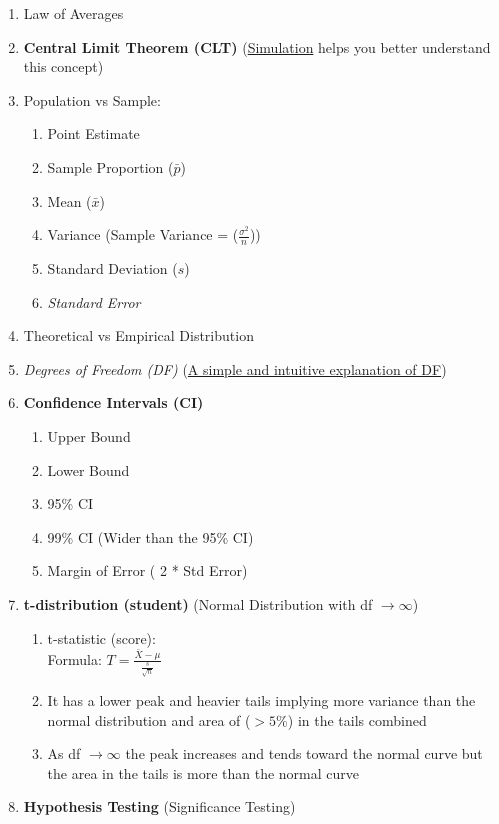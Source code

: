 \documentclass[11pt]{article}
\begin{document}
\begin{enumerate}
		\item Law of Averages
		\item \textbf{Central Limit Theorem (CLT)} (\href{http://onlinestatbook.com/2/sampling_distributions/clt_demo.html}{Simulation} helps you better understand this concept)
		\item Population vs Sample:
		\begin{enumerate}
			\item Point Estimate
			\item Sample Proportion ($\bar{p}$)
			\item Mean ($\bar{x}$)
			\item Variance (Sample Variance = ($ \frac{\sigma^2}{n} $))
			\item Standard Deviation ($s$)
			\item \textit{Standard Error}
		\end{enumerate}
		\item Theoretical vs Empirical Distribution
		\item \textit{Degrees of Freedom (DF)} (\href{https://www.youtube.com/watch?v=rATNoxKg1yA}{A simple and intuitive explanation of DF})
		\item \textbf{Confidence Intervals (CI)}
		\begin{enumerate}
			\item Upper Bound
			\item Lower Bound
			\item 95\% CI
			\item 99\% CI (Wider than the 95\% CI)
			\item Margin of Error ( 2 * Std Error)
		\end{enumerate}
		\item \textbf{t-distribution (student)} (Normal Distribution with df $ \to \infty$)
		\begin{enumerate}
			\item t-statistic (score):\\
			Formula: 
			$T = \frac{ \bar{X} - \mu}{ \frac{s}{\sqrt{n}} }$
			\item It has a lower peak and heavier tails implying more variance than the normal distribution and area of ($> 5\%$) in the tails combined
			\item As df $\to \infty$ the peak increases and tends toward the normal curve but the area in the tails is more than the normal curve
		\end{enumerate}
		\item \textbf{Hypothesis Testing} (Significance Testing)

\end{enumerate}
\end{document}
